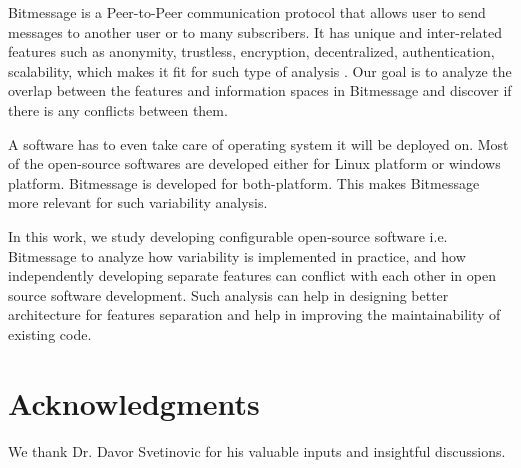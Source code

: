 \documentclass{acm_proc_article-sp}
\begin{document}
Bitmessage is a Peer-to-Peer communication protocol that allows user to send messages to another user or to many subscribers. It has unique and inter-related features such as anonymity,  trustless, encryption, decentralized, authentication, scalability,
which makes it fit for such type of analysis \cite{Warren}. Our goal is to analyze the overlap between the features and information spaces in Bitmessage and discover if there is any conflicts between them.

A software has to even take care of operating system it will be deployed on. Most of the open-source softwares are developed either for Linux platform or windows platform. Bitmessage is developed for both-platform. This makes Bitmessage more relevant for such variability analysis.



In this work, we study developing configurable open-source software i.e. Bitmessage to analyze how variability is implemented in practice, and how independently developing separate features can conflict with each other in open source software development. Such analysis can help in designing better architecture for features separation and help in  improving the maintainability of existing code.




\section{Acknowledgments}
We thank Dr. Davor Svetinovic for his valuable inputs and insightful discussions.
%
\end{document}

